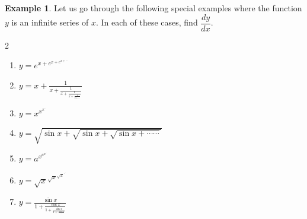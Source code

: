 \documentclass[../../main.tex]{subfiles}
\theoremstyle{definition}
\newtheorem{example}{Example}[section]
\begin{document}
\begin{example}
Let us go through the following special examples where the function $y$ is an infinite series of $x$. In each of these cases, find $\dfrac{dy}{dx}$.

\begin{multicols}{2}
\begin{enumerate}[label=(\roman*)]
    \item $y=e^{x+e^{x+e^{x+\cdots}}}$
    \item $y=x+\frac{1}{x+\frac{1}{x+\frac{1}{x+\frac{1}{x+\cdots}}}}$
    \item $y = x^{x^{x^{\cdot^{\cdot^{\cdot}}}}}$
    \item $y=\sqrt{\sin x+\sqrt{\sin x+\sqrt{\sin x+\cdots \cdots}}}$
    \item $y= a^{x^{a^{x^{\cdot^{\cdot}}}}}$
    \item $y=\sqrt{x}^{\sqrt{x}^{\sqrt{x}^{\cdot^{\cdot^{\cdot}}}}}$
    \item $y=\frac{\sin x}{1+\frac{\cos x}{1+\frac{\sin x}{1+\frac{\cos x}{\cdots}}}}$
\end{enumerate}
\end{multicols}
\end{example}
\end{document}
